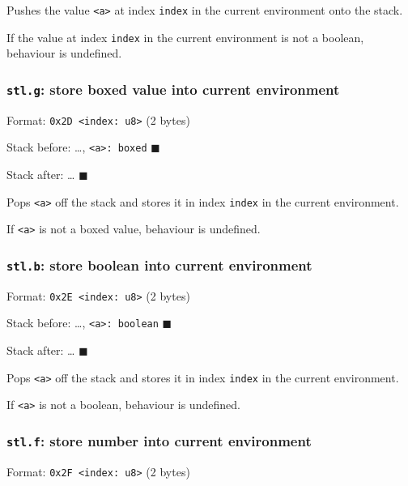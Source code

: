 Pushes the value \texttt{\textless{}a\textgreater{}} at index
\texttt{index} in the current environment onto the stack.

If the value at index \texttt{index} in the current environment is not a
boolean, behaviour is undefined.

\subsubsection{\texorpdfstring{\texttt{stl.g}: store boxed value into
current environment}{stl.g: store boxed value into current environment}}

Format: \texttt{0x2D\ \textless{}index:\ u8\textgreater{}} (2 bytes)

Stack before: \ldots, \texttt{\textless{}a\textgreater{}:\ boxed}
\(\blacksquare\)

Stack after: \ldots{} \(\blacksquare\)

Pops \texttt{\textless{}a\textgreater{}} off the stack and stores it in
index \texttt{index} in the current environment.

If \texttt{\textless{}a\textgreater{}} is not a boxed value, behaviour
is undefined.

\subsubsection{\texorpdfstring{\texttt{stl.b}: store boolean into
current environment}{stl.b: store boolean into current environment}}

Format: \texttt{0x2E\ \textless{}index:\ u8\textgreater{}} (2 bytes)

Stack before: \ldots, \texttt{\textless{}a\textgreater{}:\ boolean}
\(\blacksquare\)

Stack after: \ldots{} \(\blacksquare\)

Pops \texttt{\textless{}a\textgreater{}} off the stack and stores it in
index \texttt{index} in the current environment.

If \texttt{\textless{}a\textgreater{}} is not a boolean, behaviour is
undefined.

\subsubsection{\texorpdfstring{\texttt{stl.f}: store number into current
environment}{stl.f: store number into current environment}}

Format: \texttt{0x2F\ \textless{}index:\ u8\textgreater{}} (2 bytes)

